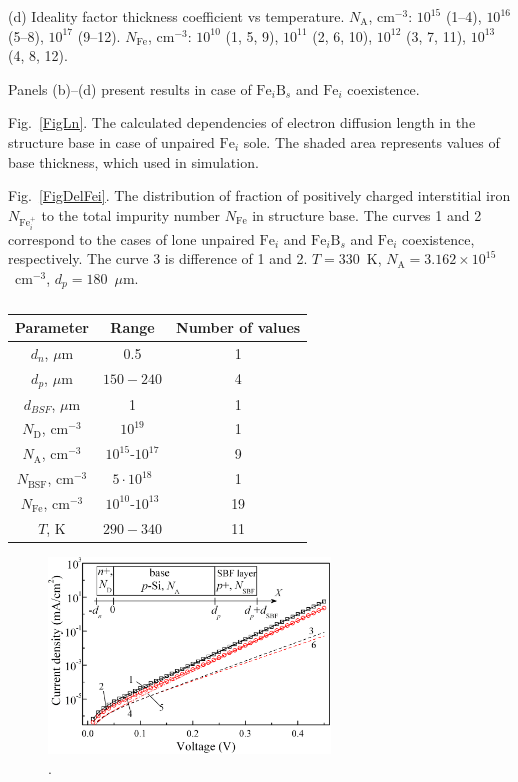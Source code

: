 \documentclass[12pt]{article}
\begin{document}
(d) Ideality factor thickness coefficient vs temperature.
$N_\mathrm{A}$, cm$^{-3}$: $10^{15}$ (1--4), $10^{16}$ (5--8),  $10^{17}$ (9--12).
$N_\mathrm{Fe}$, cm$^{-3}$: $10^{10}$ (1, 5, 9), $10^{11}$ (2, 6, 10),  $10^{12}$ (3, 7, 11), $10^{13}$ (4, 8, 12).

Panels (b)--(d) present results in  case of $\mathrm{Fe}_i\mathrm{B}_s$ and $\mathrm{Fe}_i$ coexistence.

 Fig.~\ref{FigLn}.
The calculated dependencies of electron diffusion length in the structure base
in case of unpaired $\mathrm{Fe}_i$ sole.
The shaded area represents values of base thickness, which used in simulation.

 Fig.~\ref{FigDelFei}.
The distribution of fraction of positively charged interstitial iron $N_{\mathrm{Fe}_i^+}$ to the total
impurity number $N_{\mathrm{Fe}}$ in structure base.
The curves 1 and 2 correspond to the cases of lone unpaired $\mathrm{Fe}_i$ and $\mathrm{Fe}_i\mathrm{B}_s$ and $\mathrm{Fe}_i$ coexistence,
respectively.
The curve 3 is difference of 1 and 2.
$T=330$~K, $N_\mathrm{A}=3.162\times10^{15}$~cm$^{-3}$, $d_p=180$~$\mu$m.



\newpage

\begin{table}
\caption{\label{tabParametr}
}
\begin{tabular}{|c|c|c|}
\hline
Parameter& Range& Number of values\\
\hline
$d_n$, $\mu$m&0.5&1\\
\hline
$d_p$, $\mu$m&$150-240$&4\\
\hline
$d_{BSF}$, $\mu$m&1&1\\
\hline
$N_\mathrm{D}$, cm$^{-3}$&$10^{19}$&1\\
\hline
$N_\mathrm{A}$, cm$^{-3}$&$10^{15}$-$10^{17}$&9\\
\hline
$N_\mathrm{BSF}$, cm$^{-3}$&$5\cdot10^{18}$&1\\
\hline
$N_\mathrm{Fe}$, cm$^{-3}$&$10^{10}$-$10^{13}$&19\\
\hline
$T$, K&$290-340$&11\\
\hline
\end{tabular}
\end{table}

\begin{figure}
\includegraphics[width=7.5cm]{FigIV}
\caption{.
}
\label{FigIV}
\end{figure}
\end{document}
